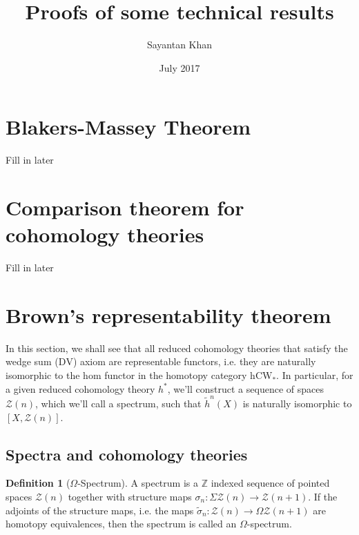 \documentclass[12pt, notitlepage]{article}
\title{Proofs of some technical results}
\author{Sayantan Khan}
\date{July 2017}
\theoremstyle{definition}
\newtheorem{defn}{Definition}[section]
\newcommand{\cat}[1]{\mathrm{#1}}
\newcommand{\cohomtheorie}{{h}^{\ast}}
\newcommand{\calz}{\mathcal{Z}}
\newcommand{\redco}{\widetilde{h}}
\newcommand{\dv}{\mathrm{DV}}
\begin{document}
\maketitle

\tableofcontents


\newpage

\section{Blakers-Massey Theorem}
\label{sec:blak-mass-theor}

Fill in later

\section{Comparison theorem for cohomology theories}
\label{sec:comp-theor-cohom}

Fill in later

\section{Brown's representability theorem}
\label{sec:browns-repr-theor}

In this section, we shall see that all reduced cohomology theories that satisfy the wedge sum
($\dv$) axiom are representable functors, i.e. they are naturally isomorphic to the hom functor in
the homotopy category $\cat{hCW}_{\ast}$. In particular, for a given reduced cohomology theory
$\cohomtheorie$, we'll construct a sequence of spaces $\calz(n)$, which we'll call a spectrum, such
that $\redco^n(X)$ is naturally isomorphic to $\left[X, \calz(n)\right]$.

\subsection{Spectra and cohomology theories}
\label{sec:spectra-cohom-theor}

\begin{defn}[$\Omega$-Spectrum]
  A spectrum is a $\mathbb{Z}$ indexed sequence of pointed spaces $\calz(n)$ together with
  structure maps $\sigma_n: \Sigma \calz(n) \to \calz(n+1)$. If the adjoints of the structure maps,
  i.e. the maps $\widetilde{\sigma}_n: \calz(n) \to \Omega \calz(n+1)$ are homotopy equivalences,
  then the spectrum is called an $\Omega$-spectrum.
\end{defn}
\end{document}
